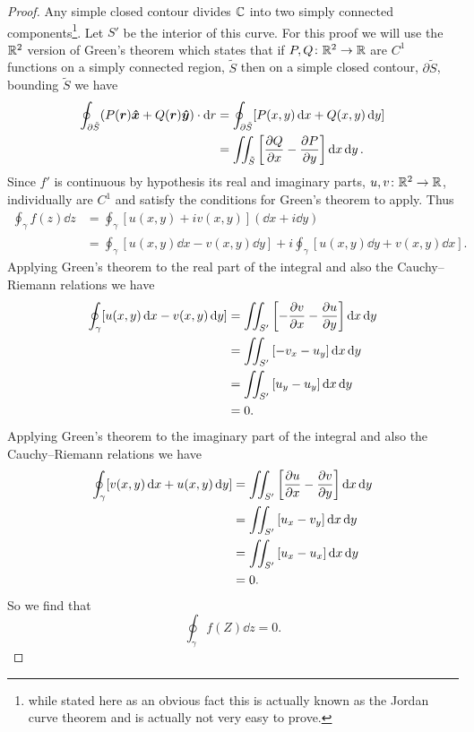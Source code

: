 \documentclass{article}
\begin{document}
\begin{proof}
        Any simple closed contour divides \(\mathbb{C}\) into two simply connected components\footnote{while stated here as an obvious fact this is actually known as the Jordan curve theorem and is actually not very easy to prove.}.
        Let \(S'\) be the interior of this curve.
        For this proof we will use the \(\mathbb{R}^2\) version of Green's theorem which states that if \(P, Q\colon\mathbb{R}^2\to\mathbb{R}\) are \(C^1\) functions on a simply connected region, \(\tilde{S}\) then on a simple closed contour, \(\partial \tilde{S}\), bounding \(\tilde{S}\) we have
        \begin{align*}
            \oint_{\partial \tilde{S}} (P(\bm{r})\bm{\hat{x}} + Q(\bm{r})\bm{\hat{y}}) \cdot \dd{r} &= \oint_{\partial \tilde{S}} [P(x, y)\dd{x} + Q(x, y)\dd{y}]\\
            &= \iint_{\tilde{S}} \left[\pdv{Q}{x} - \pdv{P}{y}\right]\dd{x}\dd{y}.
        \end{align*}
        Since \(f'\) is continuous by hypothesis its real and imaginary parts, \(u,v\colon\mathbb{R}^2\to\mathbb{R}\), individually are \(C^1\) and satisfy the conditions for Green's theorem to apply.
        Thus
        \begin{align*}
            \oint_{\gamma} f(z) \dd{z} &= \oint_{\gamma} [u(x, y) + iv(x, y)](\dd{x} + i\dd{y})\\
            &= \oint_{\gamma} [u(x, y)\dd{x} - v(x, y)\dd{y}] + i\oint_{\gamma} [u(x, y)\dd{y} + v(x, y)\dd{x}].
        \end{align*}
        Applying Green's theorem to the real part of the integral and also the Cauchy--Riemann relations we have
        \begin{align*}
            \oint_{\gamma} [u(x, y)\dd{x} - v(x, y)\dd{y}] &= \iint_{S'} \left[-\pdv{v}{x} - \pdv{u}{y}\right]\dd{x}\dd{y}\\
            &= \iint_{S'} \left[-v_x - u_y\right]\dd{x}\dd{y}\\
            &= \iint_{S'} \left[u_y - u_y\right]\dd{x}\dd{y}\\
            &= 0.
        \end{align*}
        Applying Green's theorem to the imaginary part of the integral and also the Cauchy--Riemann relations we have
        \begin{align*}
            \oint_{\gamma} [v(x, y)\dd{x} + u(x, y)\dd{y}] &= \iint_{S'} \left[\pdv{u}{x} - \pdv{v}{y}\right]\dd{x}\dd{y}\\
            &= \iint_{S'} \left[u_x - v_y\right]\dd{x}\dd{y}\\
            &= \iint_{S'} \left[u_x - u_x\right]\dd{x}\dd{y}\\
            &= 0.
        \end{align*}
        So we find that
        \[\oint_\gamma f(Z) \dd{z} = 0.\]
    \end{proof}
    
\end{document}
